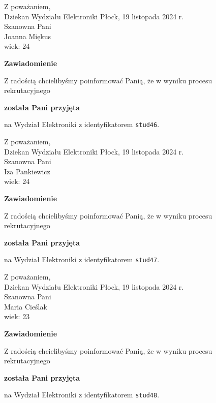 \documentclass[12pt,a4paper]{article}
\begin{document}
\noindent
Z poważaniem,\\
Dziekan
Wydziału Elektroniki
\newpage
\hfill Płock, 19 listopada 2024 r.\\ 
\noindent 
Szanowna Pani \\
Joanna Miękus \\
wiek: 24

\bigskip

\begin{center}
{\Large\textbf{Zawiadomienie}}
\end{center}
\bigskip
Z radością chcielibyśmy poinformować Panią, że w wyniku procesu rekrutacyjnego
\begin{center}
\textsf{\textbf{została Pani przyjęta}} 
\end{center}
na Wydział Elektroniki z identyfikatorem \verb|stud46|.
\vspace{2cm}

\noindent
Z poważaniem,\\
Dziekan
Wydziału Elektroniki
\newpage
\hfill Płock, 19 listopada 2024 r.\\ 
\noindent 
Szanowna Pani \\
Iza Pankiewicz \\
wiek: 24

\bigskip

\begin{center}
{\Large\textbf{Zawiadomienie}}
\end{center}
\bigskip
Z radością chcielibyśmy poinformować Panią, że w wyniku procesu rekrutacyjnego
\begin{center}
\textsf{\textbf{została Pani przyjęta}} 
\end{center}
na Wydział Elektroniki z identyfikatorem \verb|stud47|.
\vspace{2cm}

\noindent
Z poważaniem,\\
Dziekan
Wydziału Elektroniki
\newpage
\hfill Płock, 19 listopada 2024 r.\\ 
\noindent 
Szanowna Pani \\
Maria Cieślak \\
wiek: 23

\bigskip

\begin{center}
{\Large\textbf{Zawiadomienie}}
\end{center}
\bigskip
Z radością chcielibyśmy poinformować Panią, że w wyniku procesu rekrutacyjnego
\begin{center}
\textsf{\textbf{została Pani przyjęta}} 
\end{center}
na Wydział Elektroniki z identyfikatorem \verb|stud48|.
\vspace{2cm}
\end{document}
